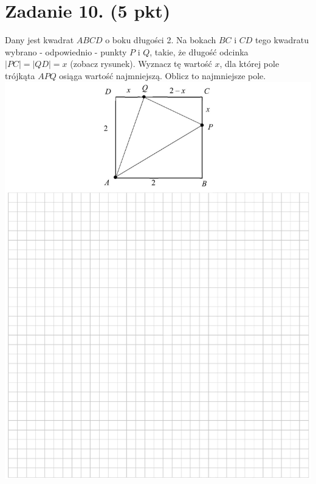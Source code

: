 \documentclass[10pt]{article}
\begin{document}
\section*{Zadanie 10. (5 pkt)}
Dany jest kwadrat \(A B C D\) o boku długości 2. Na bokach \(B C\) i \(C D\) tego kwadratu wybrano - odpowiednio - punkty \(P\) i \(Q\), takie, że długość odcinka \(|P C|=|Q D|=x\) (zobacz rysunek). Wyznacz tę wartość \(x\), dla której pole trójkąta \(A P Q\) osiąga wartość najmniejszą. Oblicz to najmniejsze pole.\\
\includegraphics[max width=\textwidth, center]{2024_11_21_ebf83f11df6f4915f701g-16}\\
\end{document}
